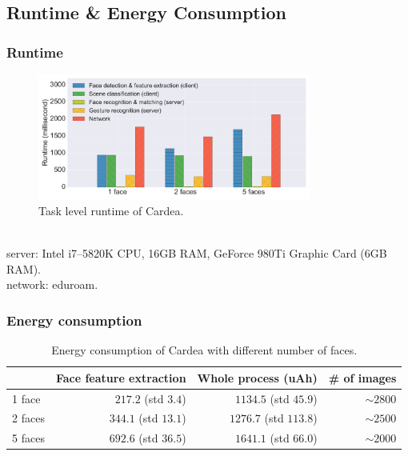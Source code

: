\subsection{Runtime \& Energy Consumption}
\begin{frame}[t]
\frametitle{Runtime}

\vspace{-0.25cm}
\begin{figure}[tb]
\centering
\includegraphics[width=0.8\textwidth]{figure/ch4-runtime.pdf}
\caption{Task level runtime of Cardea.}
\end{figure}

\\

{\scriptsize \color{blue} server: Intel i7--5820K CPU, 16GB RAM, GeForce 980Ti Graphic Card (6GB RAM).}\\

{\scriptsize \color{blue} network: eduroam.}

\end{frame}

\begin{frame}[t]
\frametitle{Energy consumption}

\begin{table}[tb]
\centering
\caption{Energy consumption of Cardea with different number of faces.}
\begin{tabular}{lrrr}
\toprule
            & Face feature extraction      & Whole process (uAh)   & \# of images \\ \midrule
1 face      & $217.2$ (std $3.4$)   & $1134.5$ (std $45.9$) & $\sim 2800$       \\
2 faces     & $344.1$ (std $13.1$)  & $1276.7$ (std $113.8$)    & $\sim 2500$       \\
5 faces     & $692.6$ (std $36.5$)  & $1641.1$ (std $66.0$) & $\sim 2000$       \\ \bottomrule
\end{tabular}
\end{table}

\end{frame}
